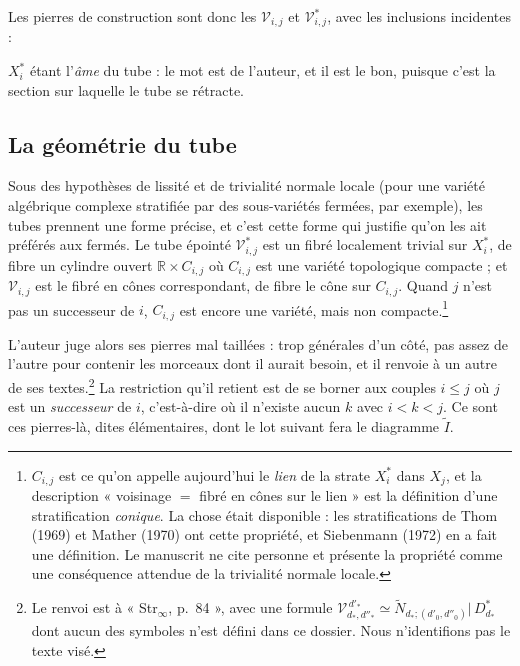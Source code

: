 \documentclass[11pt,a4paper]{article}
\begin{document}
Les pierres de construction sont donc les $\mathcal{V}_{i,j}$ et
$\mathcal{V}^{*}_{i,j}$, avec les inclusions incidentes :


$X_{i}^{*}$ étant l'\emph{âme} du tube : le mot est de l'auteur, et il est le
bon, puisque c'est la section sur laquelle le tube se rétracte.

\subsection*{La géométrie du tube}

Sous des hypothèses de lissité et de trivialité normale locale (pour une variété
algébrique complexe stratifiée par des sous-variétés fermées, par exemple), les
tubes prennent une forme précise, et c'est cette forme qui justifie qu'on les ait
préférés aux fermés. Le tube épointé $\mathcal{V}^{*}_{i,j}$ est un fibré
localement trivial sur $X_{i}^{*}$, de fibre un cylindre ouvert
$\mathbb{R} \times C_{i,j}$ où $C_{i,j}$ est une variété topologique compacte ;
et $\mathcal{V}_{i,j}$ est le fibré en cônes correspondant, de fibre le cône sur
$C_{i,j}$. Quand $j$ n'est pas un successeur de $i$, $C_{i,j}$ est encore une
variété, mais non compacte.\footnote{$C_{i,j}$ est ce qu'on appelle aujourd'hui
le \emph{lien} de la strate $X_{i}^{*}$ dans $X_{j}$, et la description « voisinage
$=$ fibré en cônes sur le lien » est la définition d'une stratification
\emph{conique}. La chose était disponible : les stratifications de
Thom (1969) et Mather (1970) ont cette propriété, et Siebenmann (1972)
en a fait une définition. Le manuscrit ne cite personne et présente la propriété
comme une conséquence attendue de la trivialité normale locale.}

L'auteur juge alors ses pierres mal taillées : trop générales d'un côté, pas
assez de l'autre pour contenir les morceaux dont il aurait besoin, et il renvoie
à un autre de ses textes.\footnote{Le renvoi est à « Str$_{\infty}$, p.~84 »,
avec une formule $\mathcal{V}^{\,d'_{*}}_{d_{*},d''_{*}} \simeq
\widetilde{N}_{d_{*};(d'_{0},d''_{0})}|\,D^{*}_{d_{*}}$ dont aucun des symboles
n'est défini dans ce dossier. Nous n'identifions pas le texte visé.} La
restriction qu'il retient est de se borner aux couples $i \leq j$ où $j$ est un
\emph{successeur} de $i$, c'est-à-dire où il n'existe aucun $k$ avec
$i < k < j$. Ce sont ces pierres-là, dites élémentaires, dont le lot suivant
fera le diagramme $\widetilde{I}$.
\end{document}
